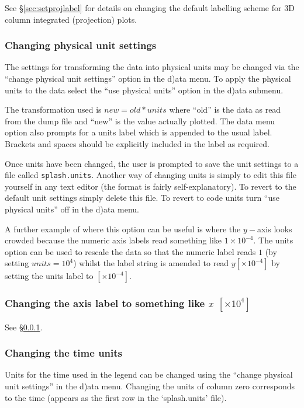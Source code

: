 \documentclass[a4paper,10pt]{article}
\begin{document}
See \S\ref{sec:setprojlabel} for details on changing the default labelling scheme for 3D column integrated (projection) plots.

\subsubsection{ Changing physical unit settings}
\label{sec:changingunits}
The settings for transforming the data into physical units may be changed via the ``change physical unit settings'' option in the d)ata menu. To apply the physical units to the data select the ``use physical units'' option in the d)ata submenu.

 The transformation used is $new= old*units$ where ``old'' is the data as read from the dump file and ``new'' is the value actually plotted. The data menu option also prompts for a units label which is appended to the usual label. Brackets and spaces should be explicitly included in the label as required.
 
  Once units have been changed, the user is prompted to save the unit settings to a file called \verb+splash.units+. Another way of changing units is simply to edit this file yourself in any text editor (the format is fairly self-explanatory). To revert to the default unit settings simply delete this file. To revert to code units turn ``use physical units'' off in the d)ata menu.
 
 A further example of where this option can be useful is where the $y-$axis looks crowded because the numeric axis labels read something
like $1\times 10^{-4}$. The units option can be used to rescale the data so
that the numeric label reads $1$ (by setting $units=10^{4}$) whilst the label string is amended to read $y
[\times 10^{-4}]$ by setting the units label to $ [ \times 10^{-4}]$.

\subsubsection{ Changing the axis label to something like $x$ $[ \times 10^{4} ]$}
See \S\ref{sec:changingunits}.

\subsubsection{ Changing the time units}
\label{sec:timeunits}
Units for the time used in the legend can be changed using the ``change physical unit settings'' in the d)ata menu. Changing the units of column zero corresponds to the time (appears as the first row in the `splash.units' file). 
\end{document}
